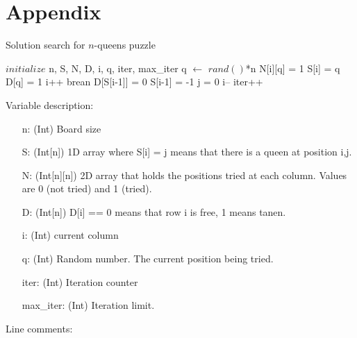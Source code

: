 \documentclass{article}
\begin{document}
\section{Appendix}
\begin{algorithm}[H]
\caption{Solution search for $n$-queens puzzle}
\label{alg:solvePuzzle}
\begin{algorithmic}[1]
    \State $initialize$ n, S, N, D, i, q, iter, max\_iter
        \State q $\gets$ $rand()$*n
            \State N[i][q] = 1 
                \State S[i] = q
                \State D[q] = 1
                \State i++
                    \State brean
                \EndIf
            \EndIf
        \EndIf 
        \State D[S[i-1]] = 0
        \State S[i-1] = -1
            \State j = 0
        \EndFor     
        \State i--
    \EndIf
    \State iter++
    \EndWhile  
\end{algorithmic}
\end{algorithm}
Variable description:
\begin{enumerate}
    \item [n:] (Int) Board size
    \item [S:] (Int[n]) 1D array where S[i] = j means that there is a queen at position i,j. 
    \item [N:] (Int[n][n]) 2D array that holds the positions tried at each column. Values are 0 (not tried) and 1 (tried).
    \item [D:] (Int[n]) D[i] == 0 means that row i is free, 1 means tanen.
    \item [i:] (Int) current column 
    \item [q:] (Int) Random number. The current position being tried.
    \item [iter:] (Int) Iteration counter
    \item [max\_iter:] (Int) Iteration limit.
\end{enumerate}
Line comments:
\end{document}
